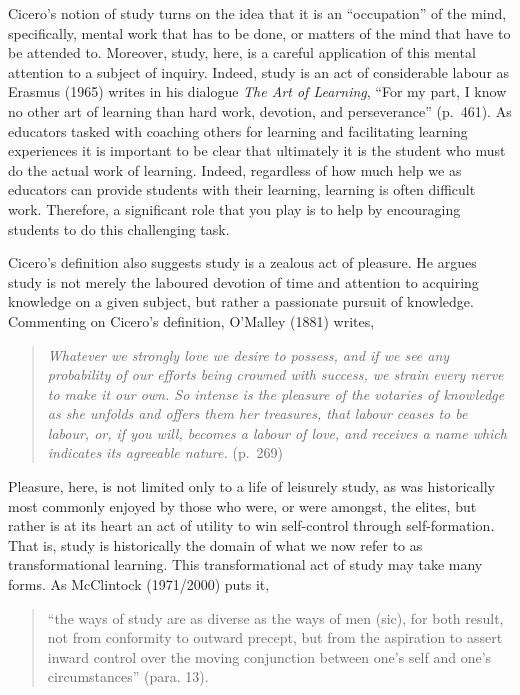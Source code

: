 \documentclass[
]{book}
\begin{document}
Cicero's notion of study turns on the idea that it is an ``occupation'' of the mind, specifically, mental work that has to be done, or matters of the mind that have to be attended to. Moreover, study, here, is a careful application of this mental attention to a subject of inquiry. Indeed, study is an act of considerable labour as Erasmus (1965) writes in his dialogue \emph{The Art of Learning}, ``For my part, I know no other art of learning than hard work, devotion, and perseverance'' (p.~461). As educators tasked with coaching others for learning and facilitating learning experiences it is important to be clear that ultimately it is the student who must do the actual work of learning. Indeed, regardless of how much help we as educators can provide students with their learning, learning is often difficult work. Therefore, a significant role that you play is to help by encouraging students to do this challenging task.

Cicero's definition also suggests study is a zealous act of pleasure. He argues study is not merely the laboured devotion of time and attention to acquiring knowledge on a given subject, but rather a passionate pursuit of knowledge. Commenting on Cicero's definition, O'Malley (1881) writes,

\begin{quote}
\emph{Whatever we strongly love we desire to possess, and if we see any probability of our efforts being crowned with success, we strain every nerve to make it our own. So intense is the pleasure of the votaries of knowledge as she unfolds and offers them her treasures, that labour ceases to be labour, or, if you will, becomes a labour of love, and receives a name which indicates its agreeable nature.} (p.~269)
\end{quote}

Pleasure, here, is not limited only to a life of leisurely study, as was historically most commonly enjoyed by those who were, or were amongst, the elites, but rather is at its heart an act of utility to win self-control through self-formation. That is, study is historically the domain of what we now refer to as transformational learning. This transformational act of study may take many forms. As McClintock (1971/2000) puts it,

\begin{quote}
``the ways of study are as diverse as the ways of men (sic), for both result, not from conformity to outward precept, but from the aspiration to assert inward control over the moving conjunction between one's self and one's circumstances'' (para. 13).
\end{quote}
\end{document}
